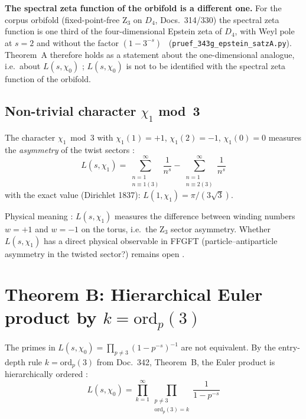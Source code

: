 \textbf{The spectral zeta function of the orbifold is a different one.} For the
corpus orbifold (fixed-point-free Z$_3$ on $D_4$, Docs.~314/330) the spectral
zeta function is one third of the four-dimensional Epstein zeta of $D_4$, with
Weyl pole at $s=2$ and without the factor $(1-3^{-s})$ \BM\
(\texttt{pruef\_343g\_epstein\_satzA.py}). Theorem~A therefore holds as a
statement about the one-dimensional analogue, i.e.\ about $L(s,\chi_0)$ \BM;
$L(s,\chi_0)$ is not to be identified with the spectral zeta function of the orbifold.

\subsection{Non-trivial character $\chi_1$ mod~3}

The character $\chi_1 \bmod 3$ with $\chi_1(1) = +1$, $\chi_1(2) = -1$,
$\chi_1(0) = 0$ measures the \emph{asymmetry} of the twist sectors \BM:
\begin{equation}
  L(s,\chi_1) = \sum_{\substack{n=1\\n\equiv 1(3)}}^\infty \frac{1}{n^s}
              - \sum_{\substack{n=1\\n\equiv 2(3)}}^\infty \frac{1}{n^s}
\end{equation}
with the exact value (Dirichlet 1837): $L(1,\chi_1) = \pi/(3\sqrt{3})$.

Physical meaning \SM: $L(s,\chi_1)$ measures the difference between winding
numbers $w = +1$ and $w = -1$ on the torus, i.e.\ the Z$_3$ sector asymmetry.
Whether $L(s,\chi_1)$ has a direct physical observable in FFGFT
(particle–antiparticle asymmetry in the twisted sector?) remains open \SM.

\section{Theorem B: Hierarchical Euler product by $k = \mathrm{ord}_p(3)$}

The primes in $L(s,\chi_0) = \prod_{p\neq 3}(1-p^{-s})^{-1}$ are not
equivalent. By the entry-depth rule $k = \mathrm{ord}_p(3)$ from
Doc.~342, Theorem~B, the Euler product is hierarchically ordered \BM:
\begin{equation}
  L(s,\chi_0) = \prod_{k=1}^{\infty} \prod_{\substack{p\neq 3\\ \mathrm{ord}_p(3)=k}}
  \frac{1}{1 - p^{-s}}
\end{equation}

